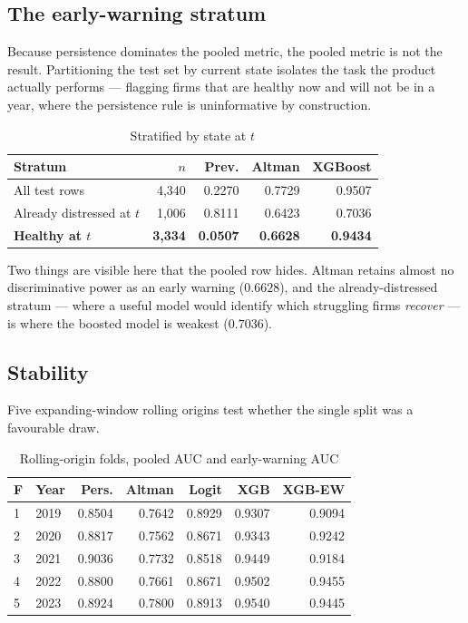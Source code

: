\documentclass[conference]{IEEEtran}
\begin{document}
\subsection{The early-warning stratum}
Because persistence dominates the pooled metric, the pooled metric is not the
result. Partitioning the test set by current state isolates the task the
product actually performs --- flagging firms that are healthy now and will not
be in a year, where the persistence rule is uninformative by construction.

\begin{table}[htbp]
\caption{Stratified by state at $t$}
\label{tab:strata}
\centering
\begin{tabular}{lrrrr}
\toprule
Stratum & $n$ & Prev. & Altman & XGBoost \\
\midrule
All test rows & 4,340 & 0.2270 & 0.7729 & 0.9507 \\
Already distressed at $t$ & 1,006 & 0.8111 & 0.6423 & 0.7036 \\
\textbf{Healthy at $t$} & \textbf{3,334} & \textbf{0.0507} & \textbf{0.6628} & \textbf{0.9434} \\
\bottomrule
\end{tabular}
\end{table}

Two things are visible here that the pooled row hides. Altman retains almost no
discriminative power as an early warning ($0.6628$), and the already-distressed
stratum --- where a useful model would identify which struggling firms
\emph{recover} --- is where the boosted model is weakest ($0.7036$).

\subsection{Stability}
Five expanding-window rolling origins test whether the single split was a
favourable draw.

\begin{table}[htbp]
\caption{Rolling-origin folds, pooled AUC and early-warning AUC}
\label{tab:roll}
\centering
\begin{tabular}{llrrrrr}
\toprule
F & Year & Pers. & Altman & Logit & XGB & XGB-EW \\
\midrule
1 & 2019 & 0.8504 & 0.7642 & 0.8929 & 0.9307 & 0.9094 \\
2 & 2020 & 0.8817 & 0.7562 & 0.8671 & 0.9343 & 0.9242 \\
3 & 2021 & 0.9036 & 0.7732 & 0.8518 & 0.9449 & 0.9184 \\
4 & 2022 & 0.8800 & 0.7661 & 0.8671 & 0.9502 & 0.9455 \\
5 & 2023 & 0.8924 & 0.7800 & 0.8913 & 0.9540 & 0.9445 \\
\bottomrule
\end{tabular}
\end{table}
\end{document}
